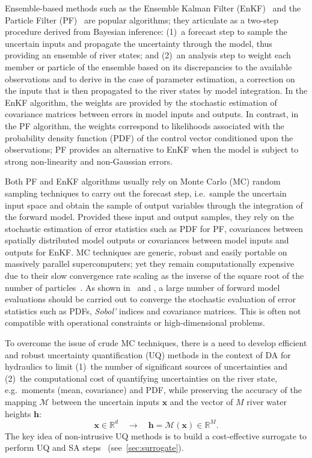 Ensemble-based methods such as the Ensemble Kalman Filter (EnKF)~\citep{durand2008,moradkhani2005,ELSheikh2013} and the Particle Filter (PF)~\citep{matgen2010,parrish2012} are popular algorithms; they articulate as a two-step procedure derived from Bayesian inference: (1)~a forecast step to sample the uncertain inputs and propagate the uncertainty through the model, thus providing an ensemble of river states; and (2)~an analysis step to weight each member or particle of the ensemble based on its discrepancies to the available observations and to derive in the case of parameter estimation, a correction on the inputs that is then propagated to the river states by model integration. In the EnKF algorithm, the weights are provided by the stochastic estimation of covariance matrices between errors in model inputs and outputs. In contrast, in the PF algorithm, the weights correspond to likelihoods associated with the probability density function (PDF) of the control vector conditioned upon the observations; PF provides an alternative to EnKF when the model is subject to strong non-linearity and non-Gaussian errors. 

Both PF and EnKF algorithms usually rely on Monte Carlo (MC) random sampling techniques to carry out the forecast step, i.e.~sample the uncertain input space and obtain the sample of output variables through the integration of the forward model. Provided these input and output samples, they rely on the stochastic estimation of error statistics such as PDF for PF, covariances between spatially distributed model outputs or covariances between model inputs and outputs for EnKF. MC techniques are generic, robust and easily portable on massively parallel supercomputers; yet they remain computationally expensive due to their slow convergence rate scaling as the inverse of the square root of the number of particles~\citep{lixiu2008}. As shown in~\citet{barthelemy2015} and \citet{bozzi2015}, a large number of forward model evaluations should be carried out to converge the stochastic evaluation of error statistics such as PDFs, \emph{Sobol'} indices and covariance matrices. This is often not compatible with operational constraints or high-dimensional problems. 

To overcome the issue of crude MC techniques, there is a need to develop efficient and robust uncertainty quantification (UQ) methods in the context of DA for hydraulics to limit (1)~the number of significant sources of uncertainties and (2)~the computational cost of quantifying uncertainties on the river state, e.g.~moments (mean, covariance) and PDF, while preserving the accuracy of the mapping $\mathcal{M}$ between the uncertain inputs $\mathbf{x}$ and the vector of $M$ river water heights $\mathbf{h}$:
\begin{equation}
\mathbf{x} \in \mathbb{R}^d \quad \rightarrow \quad \mathbf{h} = \mathcal{M}(\mathbf{x})\in\mathbb{R}^M.
\end{equation}
The key idea of non-intrusive UQ methods is to build a cost-effective surrogate to perform UQ and SA steps~\citep{iooss2010,iooss2016,lamboni2011,lemaitreknio2010,Saltelli2007,storlie2009} (see~\cref{sec:surrogate}).

